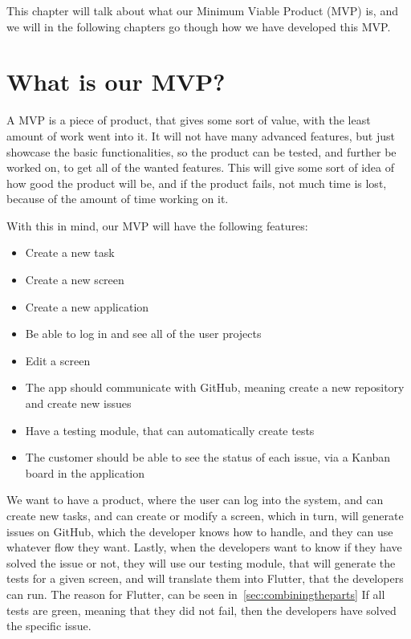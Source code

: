 This chapter will talk about what our Minimum Viable Product (MVP) is, and we will in the following chapters go though how we have developed this MVP.

\section{What is our MVP?}
A MVP is a piece of product, that gives some sort of value, with the least amount of work went into it.
It will not have many advanced features, but just showcase the basic functionalities, so the product can be tested, and further be worked on, to get all of the wanted features.
This will give some sort of idea of how good the product will be, and if the product fails, not much time is lost, because of the amount of time working on it. \cite{whatIsMVP}

With this in mind, our MVP will have the following features:

\begin{itemize}
    \item Create a new task
    \item Create a new screen
    \item Create a new application
    \item Be able to log in and see all of the user projects
    \item Edit a screen 
    \item The app should communicate with GitHub, meaning create a new repository and create new issues
    \item Have a testing module, that can automatically create tests
    \item The customer should be able to see the status of each issue, via a Kanban board in the application
\end{itemize}

We want to have a product, where the user can log into the system, and can create new tasks, and can create or modify a screen, which in turn, will generate issues on GitHub, which the developer knows how to handle, and they can use whatever flow they want.
Lastly, when the developers want to know if they have solved the issue or not, they will use our testing module, that will generate the tests for a given screen, and will translate them into Flutter, that the developers can run. The reason for Flutter, can be seen in~\autoref{sec:combiningtheparts} 
If all tests are green, meaning that they did not fail, then the developers have solved the specific issue.
